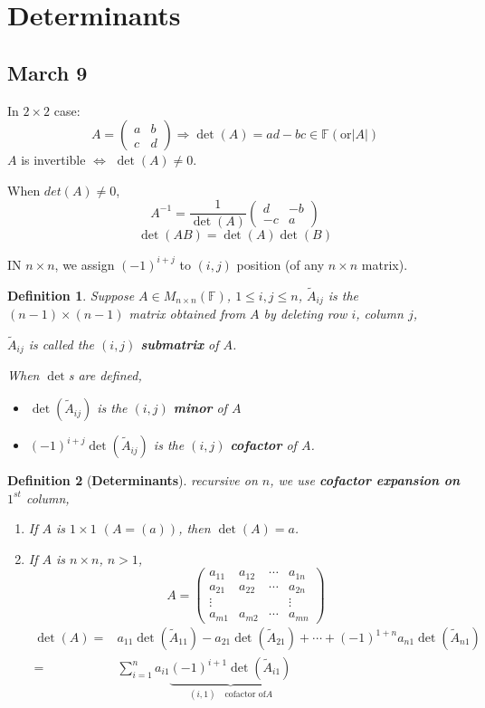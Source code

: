 \documentclass[12pt]{article}
\newtheorem{definition}{Definition}[subsection]
\newcommand{\mF}{{\mathbb{F}}}
\begin{document}
\section{Determinants}
\subsection{March 9}
In $2\times 2$ case:
\[
	A =
	\begin{pmatrix}
		a & b	\\
		c & d	
	\end{pmatrix}
	\Rightarrow
	\det (A) = ad - bc \in \mF (\text{or} |A|)
\]
$A$ is invertible $\iff$ $\det(A) \neq 0$. 

When $det(A) \neq 0$, 
\[
	A^{-1} = \frac1{\det(A)} 
	\begin{pmatrix}
		d & -b	\\
		-c & a
	\end{pmatrix}
\]
\[
	\det(AB) = \det(A)\det(B)
\]


IN $n\times n$,
we assign $(-1)^{i+j}$ to $(i,j)$ position (of any $n\times n$ matrix). 

\begin{definition}
	Suppose $A \in M_{n\times n}(\mF)$, $1\leq i, j \leq n$, 
	$\tilde A_{ij}$ is the $(n-1)\times(n-1)$ matrix obtained from
			$A$ by deleting row $i$, column $j$, 

	$\tilde A_{ij}$ is called the $(i,j)$ \textbf{submatrix} of $A$.

	When $\det$s are defined, 
	\begin{itemize}
		\item $\det(\tilde A_{ij})$ is the $(i,j)$ \textbf{minor} of $A$
		\item $(-1)^{i+j} \det(\tilde A_{ij})$ is the $(i,j)$ \textbf{cofactor}
			of $A$.		\\
	\end{itemize}
\end{definition}

\begin{definition}[\textbf{Determinants}]
	recursive on $n$, we use \textbf{cofactor expansion on $1^{st}$} column,
	\begin{enumerate}
		\item If $A$ is $1\times 1$ $(A = (a))$, then $\det(A) = a$.
		\item If $A$ is $n\times n$, $n > 1$, 
			\[
				A = 
				\begin{pmatrix}
					a_{11} & a_{12} & \cdots & a_{1n}	\\
					a_{21} & a_{22} & \cdots & a_{2n}	\\
					\vdots &		&		 & \vdots	\\
					a_{m1} & a_{m2} & \cdots & a_{mn}	
				\end{pmatrix}
			\]
			\begin{align*}
				\det(A) 
				=& a_{11} \det(\tilde A_{11}) - a_{21} \det(\tilde A_{21})
				+ \cdots + (-1)^{1+n} a_{n1} \det(\tilde A_{n1})	\\
				=& \sum_{i=1}^n a_{i1} 
				\underbrace{(-1)^{i+1} \det(\tilde A_{i1})}_{(i,1) \quad
				\text{cofactor of} A}
			\end{align*}
	\end{enumerate}
\end{definition}
\end{document}
